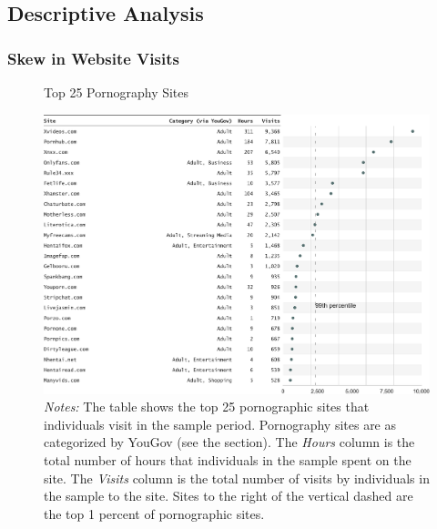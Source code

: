 \documentclass[12pt, letterpaper]{article}
\begin{document}
\FloatBarrier
\subsection{Descriptive Analysis}

\subsubsection{Skew in Website Visits}
\begin{figure}[ht]
	\centering
	\caption{Top 25 Pornography Sites}
	\includegraphics[width=\textwidth]{figs/top_25_adultsites.pdf}
	\caption*{\footnotesize \emph{Notes:} 
		The table shows the top 25 pornographic sites that individuals visit in the sample period.
		Pornography sites are as categorized by YouGov (see the  section).
		The \emph{Hours} column is the total number of hours that individuals in the sample spent on the site. 
		The \emph{Visits} column is the total number of visits by individuals in the sample to the site.  
		Sites to the right of the vertical dashed are the top 1 percent of pornographic sites.
	}
	\label{fig:top25_adult}
\end{figure}
\end{document}
